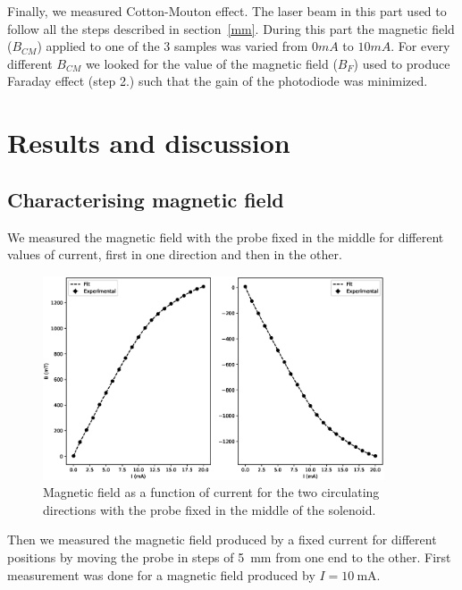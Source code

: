 \documentclass[11pt,a4paper]{article}
\begin{document}
Finally, we measured Cotton-Mouton effect. The laser beam in this part used to follow all the steps described in section~\ref{mm}. During this part the magnetic field ($B_{CM}$) applied to one of the 3 samples was varied from $0mA$ to $10mA$. For every different $B_{CM}$ we looked for the value of the magnetic field ($B_F$) used to produce Faraday effect (step 2.) such that the gain of the photodiode was minimized.

\newpage

\section{Results and discussion}

\subsection{Characterising magnetic field}

We measured the magnetic field with the probe fixed in the middle for different values of current, first in one direction and then in the other.

\begin{figure}[H]
\centering
\includegraphics[width=0.9\textwidth]{B_diff_current.eps}
\caption{Magnetic field as a function of current for the two circulating directions with the probe fixed in the middle of the solenoid.}
\label{fig:BvsI}
\end{figure}

Then we measured the magnetic field produced by a fixed current for different positions by moving the probe in steps of \SI{5}{\mm} from one end to the other. First measurement was done for a magnetic field produced by $I=\SI{10}{\mA}$.
\end{document}
